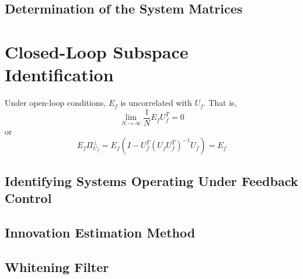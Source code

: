 \subsection{Determination of the System Matrices}




\section{Closed-Loop Subspace Identification}

Under open-loop conditions, $E_f$ is uncorrelated with $U_f$. That is,
\begin{equation*}
\lim_{N\rightarrow\infty}\frac{1}{N}E_fU_f^T =0
\end{equation*}
or 
\begin{equation*}
E_f \Pi_{U_f}^\perp = E_f(I-U_f^T(U_fU_f^T)^{-1}U_f) = E_f
\end{equation*}

\subsection{Identifying Systems Operating Under Feedback Control}

\subsection{Innovation Estimation Method}

\subsection{Whitening Filter}
